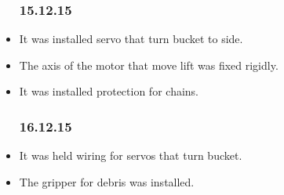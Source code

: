 \begin{itemize}
\subsubsection{15.12.15}
	\item It was installed servo that turn bucket to side.
	
	\item The axis of the motor that move lift was fixed rigidly.
	
	\item It was installed protection for chains.
	
\subsubsection{16.12.15}
	\item It was held wiring for servos that turn bucket.
	
	\item The gripper for debris was installed.
\end{itemize}

\fillpage